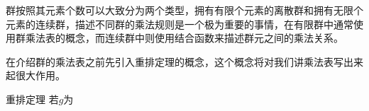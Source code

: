 

群按照其元素个数可以大致分为两个类型，拥有有限个元素的离散群和拥有无限个元素的连续群，描述不同群的乘法规则是一个极为重要的事情，在有限群中通常使用群乘法表的概念，而连续群中则使用结合函数来描述群元之间的乘法关系。

在介绍群的乘法表之前先引入重排定理的概念，这个概念将对我们讲乘法表写出来起很大作用。

\begin{theorem}{重排定理}
若$g$为
\end{theorem}